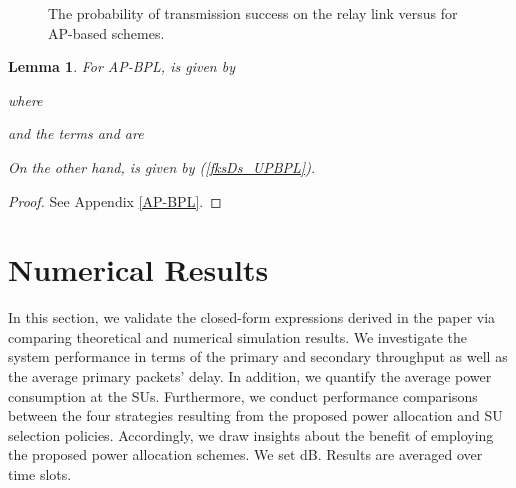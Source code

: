 \documentclass[journal,twocolumn]{IEEEtran}
\newtheorem{lemma}[theorem]{Lemma}
\begin{document}
\begin{figure*}[t]
 \centering
 \caption{The probability of transmission success on the relay link versus  for AP-based schemes.}
 \label{fr_sim_theo}
  \vspace{-3mm}
\end{figure*}

\begin{lemma}\label{lemma5}
For AP-BPL,  is given by

where

and the terms  and  are 

On the other hand,  is given by (\ref{fksDs_UPBPL}). 
\end{lemma}
\begin{proof}
See Appendix \ref{AP-BPL}.
\end{proof}

\section{Numerical Results}\label{results}
In this section, we validate the closed-form expressions derived in the paper via comparing theoretical and numerical simulation results. We investigate the system performance in terms of the primary and secondary throughput as well as the average primary packets' delay. In addition, we quantify the average power consumption at the SUs. Furthermore, we conduct performance comparisons between the four strategies resulting from the proposed power allocation and SU selection policies. Accordingly, we draw insights about the benefit of employing the proposed power allocation schemes. We set  dB. Results are averaged over  time slots.
\end{document}
